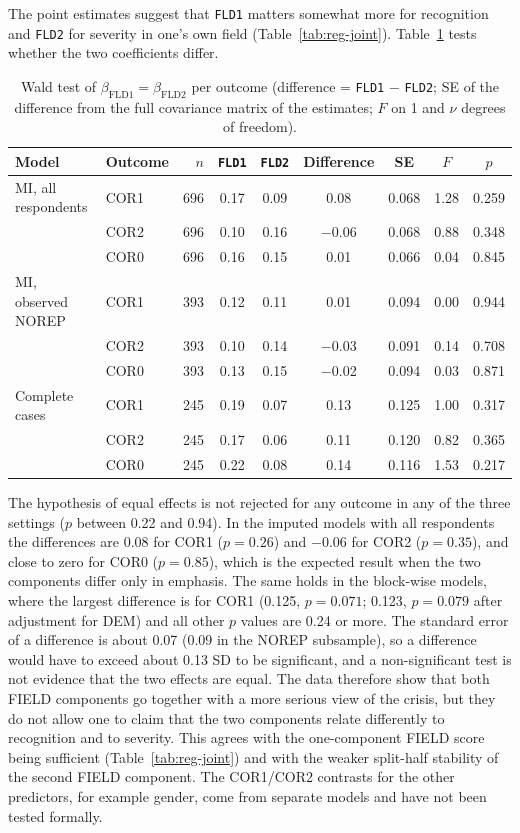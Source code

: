 \documentclass[11pt,a4paper]{article}
\newcommand{\var}[1]{\texttt{#1}}
\begin{document}
The point estimates suggest that \var{FLD1} matters somewhat more for recognition and \var{FLD2} for severity in one's own field (Table~\ref{tab:reg-joint}). Table~\ref{tab:wald} tests whether the two coefficients differ.

\begin{table}[ht]
\centering
\small
\begin{tabular}{@{}l l r c c c c c c@{}}
\toprule
Model & Outcome & $n$ & \var{FLD1} & \var{FLD2} & Difference & SE & $F$ & $p$\\
\midrule
MI, all respondents & COR1 & 696 & 0.17 & 0.09 & 0.08 & 0.068 & 1.28 & 0.259 \\
 & COR2 & 696 & 0.10 & 0.16 & $-$0.06 & 0.068 & 0.88 & 0.348 \\
 & COR0 & 696 & 0.16 & 0.15 & 0.01 & 0.066 & 0.04 & 0.845 \\
\addlinespace
MI, observed NOREP & COR1 & 393 & 0.12 & 0.11 & 0.01 & 0.094 & 0.00 & 0.944 \\
 & COR2 & 393 & 0.10 & 0.14 & $-$0.03 & 0.091 & 0.14 & 0.708 \\
 & COR0 & 393 & 0.13 & 0.15 & $-$0.02 & 0.094 & 0.03 & 0.871 \\
\addlinespace
Complete cases & COR1 & 245 & 0.19 & 0.07 & 0.13 & 0.125 & 1.00 & 0.317 \\
 & COR2 & 245 & 0.17 & 0.06 & 0.11 & 0.120 & 0.82 & 0.365 \\
 & COR0 & 245 & 0.22 & 0.08 & 0.14 & 0.116 & 1.53 & 0.217 \\
\bottomrule
\end{tabular}
\caption{Wald test of $\beta_{\mathrm{FLD1}}=\beta_{\mathrm{FLD2}}$ per outcome (difference = \var{FLD1} $-$ \var{FLD2}; SE of the difference from the full covariance matrix of the estimates; $F$ on 1 and $\nu$ degrees of freedom).}
\label{tab:wald}
\end{table}

The hypothesis of equal effects is not rejected for any outcome in any of the three settings ($p$ between 0.22 and 0.94). In the imputed models with all respondents the differences are 0.08 for COR1 ($p=0.26$) and $-0.06$ for COR2 ($p=0.35$), and close to zero for COR0 ($p=0.85$), which is the expected result when the two components differ only in emphasis. The same holds in the block-wise models, where the largest difference is for COR1 (0.125, $p=0.071$; 0.123, $p=0.079$ after adjustment for DEM) and all other $p$ values are 0.24 or more. The standard error of a difference is about 0.07 (0.09 in the NOREP subsample), so a difference would have to exceed about 0.13 SD to be significant, and a non-significant test is not evidence that the two effects are equal. The data therefore show that both FIELD components go together with a more serious view of the crisis, but they do not allow one to claim that the two components relate differently to recognition and to severity. This agrees with the one-component FIELD score being sufficient (Table~\ref{tab:reg-joint}) and with the weaker split-half stability of the second FIELD component. The COR1/COR2 contrasts for the other predictors, for example gender, come from separate models and have not been tested formally.
\end{document}
